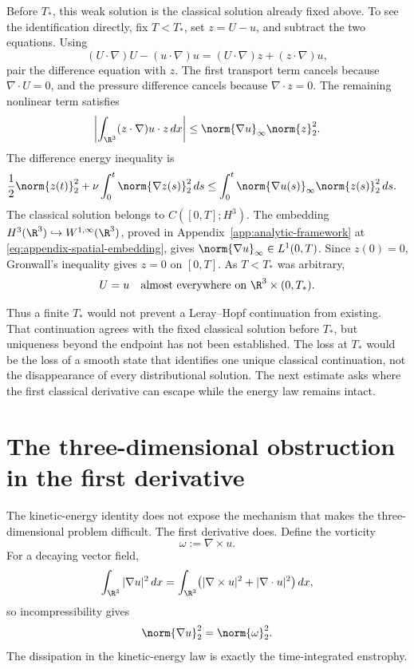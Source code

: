 Before \(T_*\), this weak solution is the classical solution already fixed
above.  To see the identification directly, fix \(T<T_*\), set \(z=U-u\),
and subtract the two equations.  Using
\[
 (U\cdot\nabla)U-(u\cdot\nabla)u
 =(U\cdot\nabla)z+(z\cdot\nabla)u,
\]
pair the difference equation with \(z\).  The first transport term cancels
because \(\nabla\cdot U=0\), and the pressure difference cancels because
\(\nabla\cdot z=0\).  The remaining nonlinear term satisfies
\[
 \left|\int_{\R^3}(z\cdot\nabla)u\cdot z\,dx\right|
 \le \norm{\nabla u}_\infty\norm{z}_2^2.
\]
The difference energy inequality is
\begin{align*}
 \frac12\norm{z(t)}_2^2
 +\nu\int_0^t\norm{\nabla z(s)}_2^2\,ds
 &\le
 \int_0^t\norm{\nabla u(s)}_\infty\norm{z(s)}_2^2\,ds.
\end{align*}
The classical solution belongs to \(C([0,T];H^3)\).  The embedding
\(H^3(\R^3)\hookrightarrow W^{1,\infty}(\R^3)\), proved in
Appendix~\ref{app:analytic-framework} at
\eqref{eq:appendix-spatial-embedding}, gives
\(\norm{\nabla u}_\infty\in L^1(0,T)\).  Since \(z(0)=0\), Gronwall's
inequality gives \(z=0\) on \([0,T]\).  As \(T<T_*\)
was arbitrary,
\begin{equation}
 U=u\quad\hbox{almost everywhere on }\R^3\times(0,T_*).
 \label{eq:weak-strong-identification}
\end{equation}

Thus a finite \(T_*\) would not prevent a Leray--Hopf continuation from
existing.  That continuation agrees with the fixed classical solution before
\(T_*\), but uniqueness beyond the endpoint has not been established.  The
loss at \(T_*\) would be the loss of a smooth state that identifies one unique
classical continuation, not the disappearance of every distributional
solution.  The next estimate asks where the first classical derivative can
escape while the energy law remains intact.

\section{The three-dimensional obstruction in the first derivative}
\label{sec:enstrophy}

The kinetic-energy identity does not expose the mechanism that makes the
three-dimensional problem difficult.  The first derivative does.  Define the
vorticity
\[
 \omega:=\nabla\times u.
\]
For a decaying vector field,
\[
 \int_{\R^3}|\nabla u|^2\,dx
 =\int_{\R^3}\bigl(|\nabla\times u|^2+|\nabla\cdot u|^2\bigr)\,dx,
\]
so incompressibility gives
\begin{equation*}
 \norm{\nabla u}_2^2=\norm{\omega}_2^2.
\end{equation*}
The dissipation in the kinetic-energy law is exactly the time-integrated
enstrophy.

